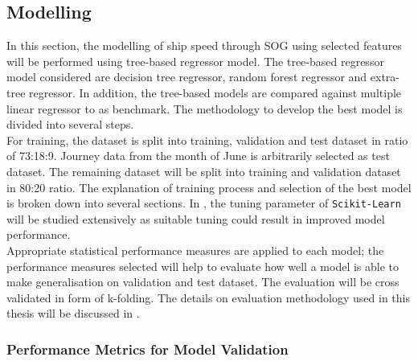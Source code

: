 \subsection{Modelling}\label{modelling}

In this section, the modelling of ship speed through SOG using selected features will be performed using tree-based regressor model. The tree-based regressor model considered are decision tree regressor, random forest regressor and extra-tree regressor. In addition, the tree-based models are compared against multiple linear regressor to as benchmark. The methodology to develop the best model is divided into several steps.\\

For training, the dataset is split into training, validation and test dataset in ratio of 73:18:9. Journey data from the month of June is arbitrarily selected as test dataset. The remaining dataset will be split into training and validation dataset in 80:20 ratio. The explanation of training process and selection of the best model is broken down into several sections. In , the tuning parameter of {\tt Scikit-Learn} will be studied extensively as suitable tuning could result in improved model performance.\\

Appropriate statistical performance measures are applied to each model; the performance measures selected will help to evaluate how well a model is able to make generalisation on validation and test dataset. The evaluation will be cross validated in form of k-folding. The details on evaluation methodology used in this thesis will be discussed in . \\

\subsubsection{Performance Metrics for Model Validation}\label{perf_metrics}


